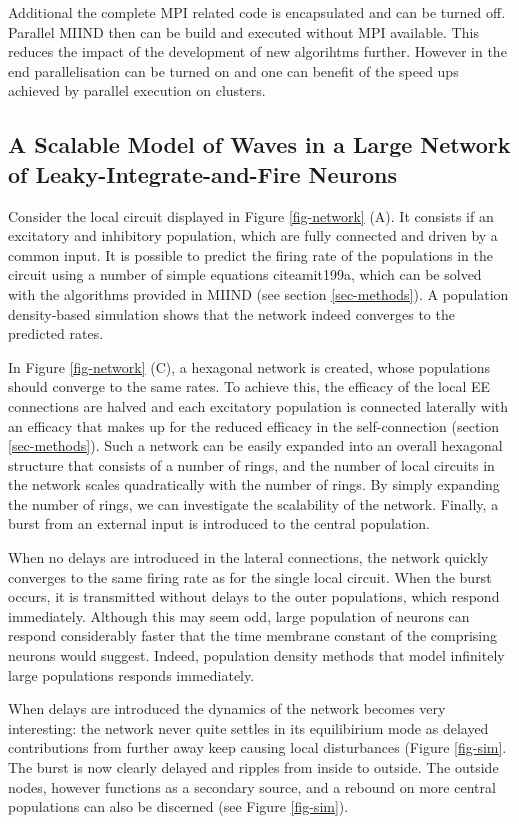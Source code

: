 \documentclass[12pt]{article}
\begin{document}
Additional the complete MPI related code is encapsulated and can be turned off. Parallel MIIND then can be build and executed without MPI available. This reduces the impact of the development of new algorihtms further. However in the end parallelisation can be turned on and one can benefit of the speed ups achieved by parallel execution on clusters.

\subsection{A Scalable Model of Waves in a Large Network of Leaky-Integrate-and-Fire Neurons}
Consider the local circuit displayed in Figure \ref{fig-network} (A). It consists if an excitatory and inhibitory population, which are fully connected
and driven by a common input. It is possible to predict the firing rate of the populations in the circuit using a number of simple equations
cite{amit199a}, which can be solved with the algorithms provided in MIIND (see section \ref{sec-methods}). A population density-based simulation
shows that the network indeed converges to the predicted rates.

In Figure \ref{fig-network} (C), a hexagonal network is created, whose populations should converge to the same rates. To achieve this, the efficacy
of the local EE connections are halved and each excitatory population is connected laterally with an efficacy that makes up for the reduced
efficacy in the self-connection (section \ref{sec-methods}). Such a network can be easily expanded into an overall hexagonal structure that consists
of a number of rings, and the number of local circuits in the network scales quadratically with the number of rings. By simply expanding the number
of rings, we can investigate the scalability of the network. Finally, a burst from an external input is introduced to the central population.

When no delays are introduced in the lateral connections, the network quickly converges to the same firing rate as for the single local circuit. When
the burst occurs, it is transmitted without delays to the outer populations, which respond immediately. Although this may seem odd, large population
of neurons can respond considerably faster that the time membrane constant of the comprising neurons would suggest. Indeed, population density methods
that model infinitely large populations responds immediately.
 
When delays are introduced the dynamics of the network becomes very interesting: the network never quite settles in its equilibirium mode as
delayed contributions from further away keep  causing local disturbances (Figure \ref{fig-sim}. The burst is now clearly delayed and
ripples from inside to outside. The outside nodes, however functions as a secondary source, and a rebound on more central populations can
also be discerned (see Figure \ref{fig-sim}).
\end{document}
